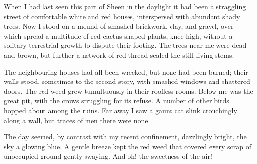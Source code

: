 When I had last seen this part of Sheen in the daylight it had been a straggling street of comfortable white and red houses, interspersed with abundant shady trees. Now I stood on a mound of smashed brickwork, clay, and gravel, over which spread a multitude of red cactus-shaped plants, knee-high, without a solitary terrestrial growth to dispute their footing. The trees near me were dead and brown, but further a network of red thread scaled the still living stems.

The neighbouring houses had all been wrecked, but none had been burned; their walls stood, sometimes to the second story, with smashed windows and shattered doors. The red weed grew tumultuously in their roofless rooms. Below me was the great pit, with the crows struggling for its refuse. A number of other birds hopped about among the ruins. Far away I saw a gaunt cat slink crouchingly along a wall, but traces of men there were none.



The day seemed, by contrast with my recent confinement, dazzlingly bright, the sky a glowing blue. A gentle breeze kept the red weed that covered every scrap of unoccupied ground gently swaying. And oh! the sweetness of the air!

